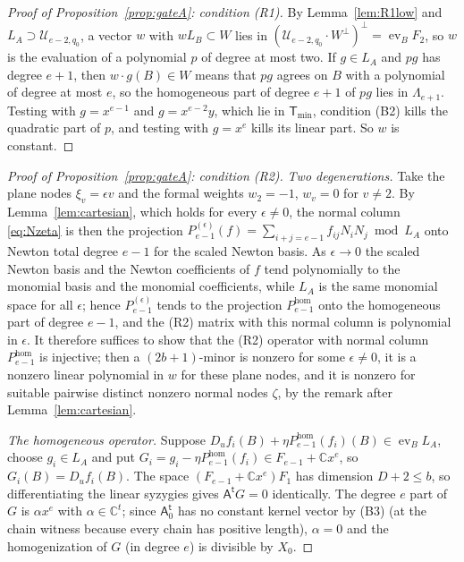 \documentclass{amsart}
\theoremstyle{definition}
\theoremstyle{remark}
\numberwithin{equation}{section}
\newcommand{\CC}{\mathbb{C}}
\DeclareMathOperator{\ev}{ev}
\begin{document}
\begin{proof}[Proof of Proposition~\ref{prop:gateA}: condition (R1)]
By Lemma~\ref{lem:R1low} and $L_A\supset\mathcal U_{e-2,q_0}$, a vector $w$ with
$wL_B\subset W$ lies in $(\mathcal U_{e-2,q_0}\cdot W^\perp)^\perp=\ev_BF_2$, so $w$ is
the evaluation of a polynomial $p$ of degree at most two. If $g\in L_A$ and $pg$ has
degree $e+1$, then $w\cdot g(B)\in W$ means that $pg$ agrees on $B$ with a polynomial of
degree at most $e$, so the homogeneous part of degree $e+1$ of $pg$ lies in
$\Lambda_{e+1}$. Testing with $g=x^{e-1}$ and
$g=x^{e-2}y$, which lie in $\mathsf T_{\min}$, condition (B2) kills the quadratic part of
$p$, and testing with $g=x^e$ kills its linear part. So $w$ is constant.
\end{proof}

\begin{proof}[Proof of Proposition~\ref{prop:gateA}: condition (R2)]
\emph{Two degenerations.} Take the plane nodes $\xi_v=\epsilon v$ and the formal weights
$w_2=-1$, $w_v=0$ for $v\ne2$. By Lemma~\ref{lem:cartesian}, which holds for every
$\epsilon\ne0$, the normal column \eqref{eq:Nzeta} is then the projection
$P^{(\epsilon)}_{e-1}(f)=\sum_{i+j=e-1}f_{ij}N_iN_j\bmod L_A$ onto Newton total degree
$e-1$ for the scaled Newton basis. As $\epsilon\to0$ the scaled Newton basis and the Newton
coefficients of $f$ tend polynomially to the monomial basis and the monomial
coefficients, while $L_A$ is the same monomial space for all $\epsilon$; hence
$P^{(\epsilon)}_{e-1}$ tends to the projection $P^{\mathrm{hom}}_{e-1}$ onto the homogeneous part
of degree $e-1$, and the (R2) matrix with this normal column is polynomial in $\epsilon$.
It therefore suffices to show that the (R2) operator with normal column $P^{\mathrm{hom}}_{e-1}$ is
injective; then a $(2b+1)$-minor is nonzero for some $\epsilon\ne0$, it is a nonzero
linear polynomial in $w$ for these plane nodes, and it is nonzero for suitable pairwise
distinct nonzero normal nodes $\zeta$, by the remark after Lemma~\ref{lem:cartesian}.

\emph{The homogeneous operator.} Suppose
$D_uf_i(B)+\eta P^{\mathrm{hom}}_{e-1}(f_i)(B)\in\ev_BL_A$, choose $g_i\in L_A$ and put
$G_i=g_i-\eta P^{\mathrm{hom}}_{e-1}(f_i)\in F_{e-1}+\CC x^e$, so $G_i(B)=D_uf_i(B)$. The space
$(F_{e-1}+\CC x^e)F_1$ has dimension $D+2\le b$, so differentiating the linear syzygies
gives $\mathsf A^{\mathsf t}G=0$ identically. The degree $e$ part of $G$ is $\alpha x^e$
with $\alpha\in\CC^t$; since $\mathsf A_0^{\mathsf t}$ has no constant kernel vector
by (B3) (at the chain witness because every chain has positive length), $\alpha=0$ and the homogenization of $G$ (in degree $e$) is
divisible by $X_0$.


\end{proof}
\end{document}

